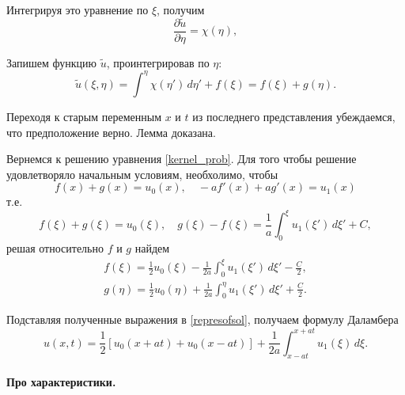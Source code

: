 Интегрируя это уравнение по $\xi$, получим
\begin{equation*}
	\frac{\partial \tilde{u}}{\partial \eta} = \chi(\eta),
\end{equation*}

Запишем функцию $\tilde{u}$, проинтегрировав по $\eta$:
\begin{equation*}
	\tilde{u}(\xi, \eta) = \int^{\eta} \chi(\eta') \, d\eta' + f(\xi) = f(\xi) + g(\eta).
\end{equation*}

Переходя к старым переменным $x$ и $t$ из последнего представления убеждаемся, что предположение верно. Лемма доказана.  


Вернемся к решению уравнения \eqref{kernel_prob}. Для того чтобы решение удовлетворяло начальным условиям, необхолимо, чтобы
\begin{equation*}
	f(x) + g(x) = u_0(x), \quad -a f'(x) + a g'(x) = u_1(x)
\end{equation*}
т.е. 
\begin{equation*}
	f(\xi) + g(\xi) = u_0(\xi), \quad g(\xi) - f(\xi) = \frac{1}{a} \int_{0}^{\xi} u_1(\xi') \, d\xi' + C,
\end{equation*}
решая относительно $f$ и $g$ найдем
\begin{align*}
	f(\xi) = \frac{1}{2} u_0(\xi) - \frac{1}{2 a} \int_{0}^{\xi} u_1(\xi') \, d\xi' - \frac{C}{2}, \\
	g(\eta) = \frac{1}{2} u_0(\eta) + \frac{1}{2 a} \int_{0}^{\eta} u_1(\xi') \, d\xi' + \frac{C}{2}.
\end{align*}

Подставляя полученные выражения в \eqref{represofsol}, получаем формулу Даламбера
\begin{equation*}
	u(x, t) = \frac{1}{2} [u_0(x + a t) + u_0(x - a t)] + \frac{1}{2 a} \int_{x - a t}^{x + a t} u_1(\xi) \, d\xi.
\end{equation*}

\paragraph{Про характеристики.}
